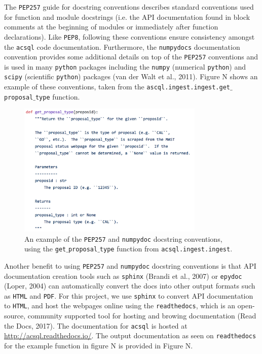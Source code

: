 \documentclass[10pt,journal,compsoc]{IEEEtran}
\begin{document}
The \texttt{PEP257} guide for docstring conventions describes standard conventions used
for function and module docstrings (i.e. the API documentation found in block
comments at the beginning of modules or immediately after function declarations).  Like
\texttt{PEP8}, following these conventions ensure consistency amongst the \texttt{acsql}
code documentation.  Furthermore, the \texttt{numpydocs} documentation convention provides
some additional details on top of the \texttt{PEP257} conventions and is used in many
\texttt{python} packages including the \texttt{numpy} (numerical \texttt{python}) and
\texttt{scipy} (scientific \texttt{python}) packages (van der Walt et al., 2011).  Figure N
shows an example of these conventions, taken from the
\texttt{ascql.ingest.ingest.get$\_$proposal$\_$type} function.

\begin{figure}[!t]
\centering
\includegraphics[width=3.5in]{./figures/docstrings.png}
\caption{An example of the \texttt{PEP257} and \texttt{numpydoc} docstring conventions,
using the \texttt{get$\_$proposal$\_$type} function from \texttt{acsql.ingest.ingest}.}
\label{fig1}
\end{figure}

Another benefit to using \texttt{PEP257} and \texttt{numpydoc} docstring conventions is
that API documentation creation tools such as \texttt{sphinx} (Brandi et al., 2007) or
\texttt{epydoc} (Loper, 2004) can automatically convert the docs into other output
formats such as \texttt{HTML} and \texttt{PDF}.  For this project, we use
\texttt{sphinx} to convert API documentation to \texttt{HTML}, and host the webpages online
using the \texttt{readthedocs}, which is an open-source, community supported tool for
hosting and browing documentation (Read the Docs, 2017). The documentation for
\texttt{acsql} is hosted at \url{http://acsql.readthedocs.io/}.  The output documentation
as seen on \texttt{readthedocs} for the example function in figure N is provided in Figure N.
\end{document}
